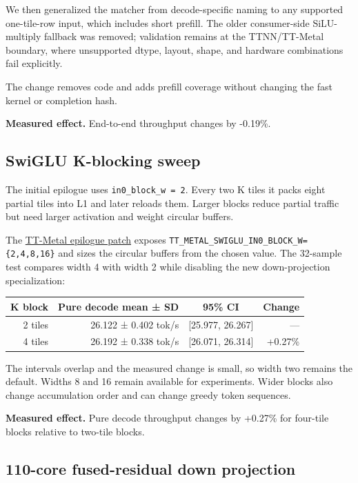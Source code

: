 \documentclass[
  10pt,
  american,
  10pt,
  letterpaper]{article}
\begin{document}
We then generalized the matcher from decode-specific naming to any
supported one-tile-row input, which includes short prefill. The older
consumer-side SiLU-multiply fallback was removed; validation remains at
the TTNN/TT-Metal boundary, where unsupported dtype, layout, shape, and
hardware combinations fail explicitly.

The change removes code and adds prefill coverage without changing the
fast kernel or completion hash.

\textbf{Measured effect.} End-to-end throughput changes by -0.19\%.

\hypertarget{swiglu-k-blocking-sweep}{%
\subsection{SwiGLU K-blocking sweep}\label{swiglu-k-blocking-sweep}}

The initial epilogue uses \texttt{in0\_block\_w\ =\ 2}. Every two K
tiles it packs eight partial tiles into L1 and later reloads them.
Larger blocks reduce partial traffic but need larger activation and
weight circular buffers.

The
\href{../../third_party/tt_metal/matmul_swiglu_epilogue.patch}{TT-Metal
epilogue patch} exposes
\texttt{TT\_METAL\_SWIGLU\_IN0\_BLOCK\_W=\{2,4,8,16\}} and sizes the
circular buffers from the chosen value. The 32-sample test compares
width 4 with width 2 while disabling the new down-projection
specialization:

\begin{longtable}[]{@{}rrcr@{}}
\toprule
K block & Pure decode mean ± SD & 95\% CI & Change\tabularnewline
\midrule
\endhead
2 tiles & 26.122 ± 0.402 tok/s & {[}25.977, 26.267{]} &
---\tabularnewline
4 tiles & 26.192 ± 0.338 tok/s & {[}26.071, 26.314{]} &
+0.27\%\tabularnewline
\bottomrule
\end{longtable}

The intervals overlap and the measured change is small, so width two
remains the default. Widths 8 and 16 remain available for experiments.
Wider blocks also change accumulation order and can change greedy token
sequences.

\textbf{Measured effect.} Pure decode throughput changes by +0.27\% for
four-tile blocks relative to two-tile blocks.

\hypertarget{core-fused-residual-down-projection}{%
\subsection{110-core fused-residual down
projection}\label{core-fused-residual-down-projection}}
\end{document}
